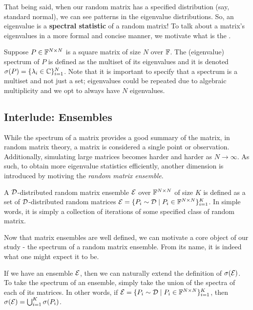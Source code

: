 That being said, when our random matrix has a specified distribution (say, standard normal), we can see patterns in the eigenvalue distributions. So, an eigenvalue is a \textbf{spectral statistic} of a random matrix! To talk about a matrix's eigenvalues in a more formal and concise manner, we motivate what is the .

\newpage

\begin{definition}[Spectrum]
Suppose $P \in \mathbb{F}^{N \times N}$ is a square matrix of size $N$ over $\mathbb{F}$. The (eigenvalue) spectrum of $P$ is defined as the multiset of its eigenvalues and it is denoted $\sigma(P) = \{\lambda_i  \in \mathbb{C}\}_{i=1}^N$. Note that it is important to specify that a spectrum is a multiset and not just a set; eigenvalues could be repeated due to algebraic multiplicity and we opt to always have $N$ eigenvalues. 
\end{definition}


\subsection{Interlude: Ensembles}
While the spectrum of a matrix provides a good summary of the matrix, in random matrix theory, a matrix is considered a single point or observation. Additionally, simulating large matrices becomes harder and harder as $N \to \infty$. As such, to obtain more eigenvalue statistics efficiently, another dimension is introduced by motiving the \textit{random matrix ensemble}.

\begin{definition}
A $\mathcal{D}$-distributed random matrix ensemble $\mathcal{E}$ over $\mathbb{F}^{N \times N}$ of size $K$ is defined as a set of $\mathcal{D}$-distributed random matrices $\mathcal{E} = \{P_i \sim \mathcal{D} \mid P_i \in \mathbb{F}^{N \times N}\}_{i = 1}^K$. In simple words, it is simply a collection of iterations of some specified class of random matrix.
\end{definition}

Now that matrix ensembles are well defined, we can motivate a core object of our study - the spectrum of a random matrix ensemble. From its name, it is indeed what one might expect it to be.

\begin{definition}
If we have an ensemble $\mathcal{E}$, then we can naturally extend the definition of $\sigma(\mathcal{E})$. To take the spectrum of an ensemble, simply take the union of the spectra of each of its matrices. In other words, if $\mathcal{E} = \{P_i \sim \mathcal{D} \mid P_i \in \mathbb{F}^{N \times N}\}_{i = 1}^K$, then $\sigma(\mathcal{E}) = \bigcup_{i=1}^K \sigma(P_i)$.
\end{definition}

